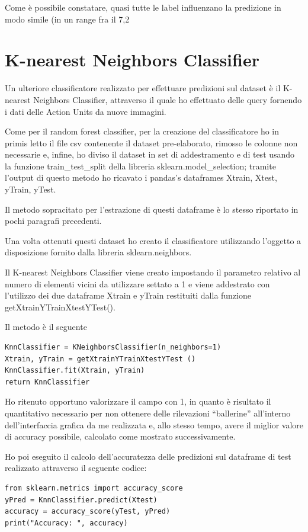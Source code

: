 Come è possibile constatare, quasi tutte le label influenzano la predizione in modo simile (in un range fra il 7,2%

\section{K-nearest Neighbors Classifier}
Un ulteriore classificatore realizzato per effettuare predizioni sul dataset è il K-nearest Neighbors Classifier, attraverso il quale ho effettuato delle query fornendo i dati delle Action Units da nuove immagini.

Come per il random forest classifier, per la creazione del classificatore ho in primis letto il file csv contenente il dataset pre-elaborato, rimosso le colonne non necessarie e, infine, ho diviso il dataset in set di addestramento e di test usando la funzione train\_test\_split della libreria sklearn.model\_selection; tramite l’output di questo metodo ho ricavato i pandas’s dataframes Xtrain, Xtest, yTrain, yTest.

Il metodo sopracitato per l’estrazione di questi dataframe è lo stesso riportato in pochi paragrafi precedenti.

Una volta ottenuti questi dataset ho creato il classificatore utilizzando l’oggetto a disposizione fornito dalla libreria sklearn.neighbors.

Il K-nearest Neighbors Classifier viene creato impostando il parametro relativo al numero di elementi vicini da utilizzare settato a 1 e viene addestrato con l’utilizzo dei due dataframe Xtrain e yTrain restituiti dalla funzione getXtrainYTrainXtestYTest().

Il metodo è il seguente
\begin{verbatim}
KnnClassifier = KNeighborsClassifier(n_neighbors=1)
Xtrain, yTrain = getXtrainYTrainXtestYTest ()
KnnClassifier.fit(Xtrain, yTrain)
return KnnClassifier
\end{verbatim}

Ho ritenuto opportuno valorizzare il campo con 1, in quanto è risultato il quantitativo necessario per non ottenere delle rilevazioni “ballerine” all’interno dell’interfaccia grafica da me realizzata e, allo stesso tempo, avere il miglior valore di accuracy possibile, calcolato come mostrato successivamente.

Ho poi eseguito il calcolo dell’accuratezza delle predizioni sul dataframe di test realizzato attraverso il seguente codice:
\begin{verbatim}
from sklearn.metrics import accuracy_score
yPred = KnnClassifier.predict(Xtest)
accuracy = accuracy_score(yTest, yPred)
print("Accuracy: ", accuracy)
\end{verbatim}


